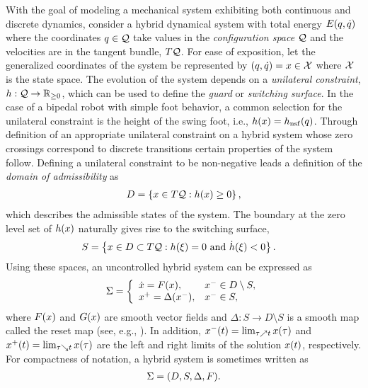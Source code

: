 With the goal of modeling a mechanical system exhibiting both continuous and
discrete dynamics, consider a hybrid dynamical system with total energy
$E(q, \dot{q})$ where the coordinates $q \in \mathcal{Q}$ take values in the {\em
  configuration space} $\mathcal{Q}$ and the velocities are in the tangent bundle,
$T\mathcal{Q}$.
%
For ease of exposition, let the generalized coordinates of the system be
represented by $(q, \dot{q}) = x \in \mathcal{X}$ where $\mathcal{X}$ is the state space.
%
The evolution of the system depends on a {\em unilateral constraint}, $h :
\mathcal{Q} \to \mathbb{R}_{\geq 0}$, which can be used to define the {\em guard} or {\em switching
  surface}.
%
In the case of a bipedal robot with simple foot behavior, a common selection for
the unilateral constraint is the height of the swing foot, i.e., $h(x) =
h_{\mathrm{nsf}}(q)$.
%
Through definition of an appropriate unilateral constraint on a hybrid system
whose zero crossings correspond to discrete transitions certain properties of
the system follow.
Defining a unilateral constraint to be non-negative leads a definition of the
{\em domain of admissibility} as
%
\begin{align}
  \label{eq:domain}
  D = \left\{ x \in T\mathcal{Q} : h(x) \geq 0 \right\},
\end{align}
%
which describes the admissible states of the system.
%
The boundary at the zero level set of $h(x)$ naturally gives rise to the
switching surface,
%
\begin{align}
  \label{eq:guard}
  S &= \left\{ x \in D \subset T\mathcal{Q} : h(\xi) = 0 \mbox{ and } {\dot h}(\xi) < 0
  \right\}.
\end{align}
%
Using these spaces, an uncontrolled hybrid system can be expressed as
%
\begin{align}
  \Sigma = \left\{
  \begin{array}{l l}
    {\dot {x}} = F(x), & x^{-} \in D \setminus S,\\
    x^{+} = \Delta(x^{-}), & x^{-} \in S,
  \end{array}\right.
  \label{eq:hsys}
\end{align}
%
where $F(x)$ and $G(x)$ are smooth vector fields and $\Delta : S \to D
\setminus S$ is a smooth map called the reset map (see, e.g.,
\cite{Morris2005}).
%
In addition, $x^{-}(t) = \lim_{\tau \nearrow t} x(\tau)$ and $x^{+}(t) =
\lim_{\tau \searrow t} x(\tau)$ are the left and right limits of the solution
$x(t)$, respectively.
%
For compactness of notation, a hybrid system is sometimes written as
\begin{align*}
  \Sigma = (D, S, \Delta, F).
\end{align*}

